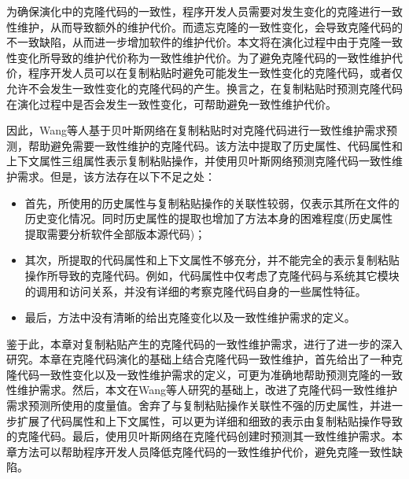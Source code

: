 为确保演化中的克隆代码的一致性，程序开发人员需要对发生变化的克隆进行一致性维护，从而导致额外的维护代价。而遗忘克隆的一致性变化，会导致克隆代码的不一致缺陷，从而进一步增加软件的维护代价\cite{aversano2007clones}\cite{bettenburg2009empirical}。本文将在演化过程中由于克隆一致性变化所导致的维护代价称为一致性维护代价。为了避免克隆代码的一致性维护代价，程序开发人员可以在复制粘贴时避免可能发生一致性变化的克隆代码，或者仅允许不会发生一致性变化的克隆代码的产生。换言之，在复制粘贴时预测克隆代码在演化过程中是否会发生一致性变化，可帮助避免一致性维护代价。

因此，Wang等人基于贝叶斯网络在复制粘贴时对克隆代码进行一致性维护需求预测，帮助避免需要一致性维护的克隆代码\cite{wang2012can}\cite{wang2014predicting}。该方法中提取了历史属性、代码属性和上下文属性三组属性表示复制粘贴操作，并使用贝叶斯网络预测克隆代码一致性维护需求。但是，该方法存在以下不足之处：
\begin{itemize}
\item
首先，所使用的历史属性与复制粘贴操作的关联性较弱，仅表示其所在文件的历史变化情况。同时历史属性的提取也增加了方法本身的困难程度(历史属性提取需要分析软件全部版本源代码)；
\item
其次，所提取的代码属性和上下文属性不够充分，并不能完全的表示复制粘贴操作所导致的克隆代码。例如，代码属性中仅考虑了克隆代码与系统其它模块的调用和访问关系，并没有详细的考察克隆代码自身的一些属性特征。
\item
最后，方法中没有清晰的给出克隆变化以及一致性维护需求的定义。
\end{itemize}

鉴于此，本章对复制粘贴产生的克隆代码的一致性维护需求，进行了进一步的深入研究。本章在克隆代码演化的基础上结合克隆代码一致性维护，首先给出了一种克隆代码一致性变化以及一致性维护需求的定义，可更为准确地帮助预测克隆的一致性维护需求。然后，本文在Wang等人研究的基础上，改进了克隆代码一致性维护需求预测所使用的度量值。舍弃了与复制粘贴操作关联性不强的历史属性，并进一步扩展了代码属性和上下文属性，可以更为详细和细致的表示由复制粘贴操作导致的克隆代码。最后，使用贝叶斯网络在克隆代码创建时预测其一致性维护需求。本章方法可以帮助程序开发人员降低克隆代码的一致性维护代价，避免克隆一致性缺陷。




